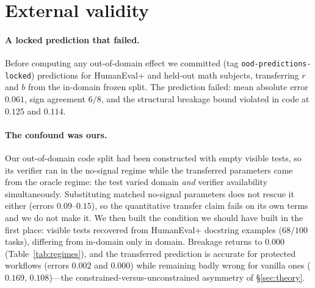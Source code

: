 \documentclass{article}
\newcommand{\rrate}{r}
\newcommand{\brate}{b}
\begin{document}
\section{External validity}
\label{sec:external}

\paragraph{A locked prediction that failed.} Before computing any out-of-domain
effect we committed (tag \texttt{ood-predictions-locked}) predictions for
HumanEval+ and held-out math subjects, transferring $\rrate$ and $\brate$ from
the in-domain frozen split. The prediction failed: mean absolute error $0.061$,
sign agreement $6/8$, and the structural breakage bound violated in code at
$0.125$ and $0.114$.

\paragraph{The confound was ours.} Our out-of-domain code split had been
constructed with empty visible tests, so its verifier ran in the no-signal
regime while the transferred parameters came from the oracle regime: the test
varied domain \emph{and} verifier availability simultaneously. Substituting
matched no-signal parameters does not rescue it either (errors $0.09$--$0.15$),
so the quantitative transfer claim fails on its own terms and we do not make it.
We then built the condition we should have built in the first place: visible
tests recovered from HumanEval+ docstring examples ($68/100$ tasks), differing
from in-domain only in domain. Breakage returns to $0.000$
(Table~\ref{tab:regimes}), and the transferred prediction is accurate for
protected workflows (errors $0.002$ and $0.000$) while remaining badly wrong for
vanilla ones ($0.169$, $0.108$)---the constrained-versus-unconstrained asymmetry
of \S\ref{sec:theory}.
\end{document}
